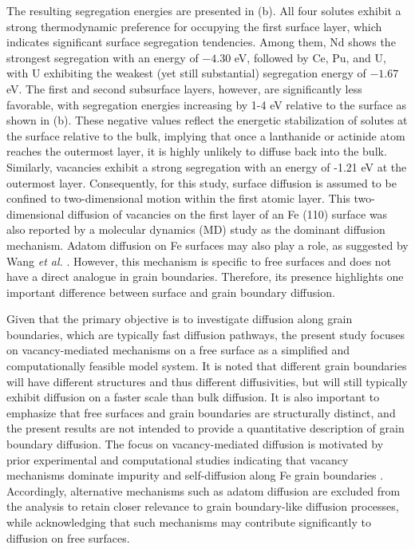 \documentclass[preprint,12pt]{elsarticle}
\begin{document}
The resulting segregation energies are presented in (b). All four solutes exhibit a strong thermodynamic preference for occupying the first surface layer, which indicates significant surface segregation tendencies. Among them, Nd shows the strongest segregation with an energy of \( -4.30 \) eV, followed by Ce, Pu, and U, with U exhibiting the weakest (yet still substantial) segregation energy of \( -1.67 \) eV.
The first and second subsurface layers, however, are significantly less favorable, with segregation energies increasing by 1-4 eV relative to the surface as shown in (b). These negative values reflect the energetic stabilization of solutes at the surface relative to the bulk, implying that once a lanthanide or actinide atom reaches the outermost layer, it is highly unlikely to diffuse back into the bulk. Similarly, vacancies exhibit a strong segregation with an energy of -1.21 eV at the outermost layer. Consequently, for this study, surface diffusion is assumed to be confined to two-dimensional motion within the first atomic layer. This two-dimensional diffusion of vacancies on the first layer of an Fe (110) surface was also reported by a molecular dynamics (MD) study \cite{wang2010single} as the dominant diffusion mechanism. Adatom diffusion on Fe surfaces may also play a role, as suggested by Wang \textit{et al.} \cite{wang2012molecular}. However, this mechanism is specific to free surfaces and does not have a direct analogue in grain boundaries. Therefore, its presence highlights one important difference between surface and grain boundary diffusion.

Given that the primary objective is to investigate diffusion along grain boundaries, which are typically fast diffusion pathways, the present study focuses on vacancy-mediated mechanisms on a free surface as a simplified and computationally feasible model system. It is noted that different grain boundaries will have different structures and thus different diffusivities, but will still typically exhibit diffusion on a faster scale than bulk diffusion. It is also important to emphasize that free surfaces and grain boundaries are structurally distinct, and the present results are not intended to provide a quantitative description of grain boundary diffusion. The focus on vacancy-mediated diffusion is motivated by prior experimental and computational studies indicating that vacancy mechanisms dominate impurity and self-diffusion along Fe grain boundaries \cite{balluffi1982grain,peterson1983grain, klotsman1990impurity, kwok1981, inoue2007grain}. Accordingly, alternative mechanisms such as adatom diffusion are excluded from the analysis to retain closer relevance to grain boundary-like diffusion processes, while acknowledging that such mechanisms may contribute significantly to diffusion on free surfaces.
\end{document}
